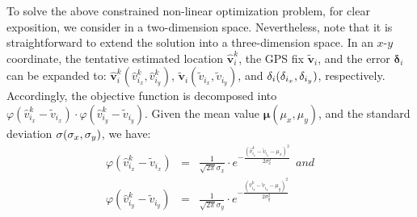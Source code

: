 \documentclass[letterpaper, 10 pt, conference]{ieeeconf}
\begin{document}
To solve the above constrained non-linear optimization problem, for clear exposition, we consider in a two-dimension space. Nevertheless, note that it is straightforward to extend the solution into a three-dimension space. In an $x$-$y$ coordinate, the tentative estimated location ${\mathbf{\hat v}}_i^k $, the GPS fix ${\mathbf{\tilde v}}_i $, and the error ${\mathbf{\delta }}_i$ can be expanded to: ${\mathbf{\hat v}}_i^k (\hat v_{i_x }^k ,\hat v_{i_y }^k )$, ${\mathbf{\tilde v}}_i (\tilde v_{i_x } ,\tilde v_{i_y } )$, and ${\bf{\delta }}_i (\delta _{i_x } ,\delta _{i_y } )$, respectively. Accordingly, the objective function is decomposed into $\varphi (\hat v_{i_x }^k  - \tilde v_{i_x } ) \cdot \varphi (\hat v_{i_y }^k  - \tilde v_{i_y } )$. Given the mean value ${\mathbf{\mu }}(\mu _x ,\mu _y )$, and the standard deviation ${\bf{\sigma }}(\sigma _x ,\sigma _y )$, we have:
\begin{eqnarray}
\varphi (\hat v_{i_x }^k  - \tilde v_{i_x } ) &=& \frac{1}{{\sqrt {2\pi } \sigma _x }} \cdot e^{ - \frac{{(\hat v_{i_x }^k  - \tilde v_{i_x }  - \mu _x )^2 }}{{2\sigma _x ^2 }}}\nonumber ~~and\\
\varphi (\hat v_{i_y }^k  - \tilde v_{i_y } ) &=& \frac{1}{{\sqrt {2\pi } \sigma _y }} \cdot e^{ - \frac{{(\hat v_{i_y }^k  - \tilde v_{i_y }  - \mu _y )^2 }}{{2\sigma _y ^2 }}}
\label{eq:pdf}
\end{eqnarray}
\end{document}

